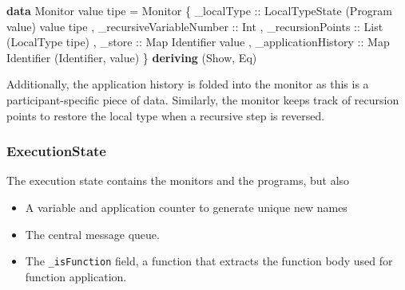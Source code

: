 \documentclass[runningheads]{llncs}
\providecommand{\tightlist}{%
  \setlength{\itemsep}{0pt}\setlength{\parskip}{0pt}}
\newenvironment{Shaded}{}{}
\newcommand{\KeywordTok}[1]{\textcolor[rgb]{0.00,0.44,0.13}{\textbf{#1}}}
\newcommand{\DataTypeTok}[1]{\textcolor[rgb]{0.56,0.13,0.00}{#1}}
\newcommand{\OtherTok}[1]{\textcolor[rgb]{0.00,0.44,0.13}{#1}}
\newcommand{\FunctionTok}[1]{\textcolor[rgb]{0.02,0.16,0.49}{#1}}
\newcommand{\NormalTok}[1]{#1}
\begin{document}
\begin{Shaded}
\begin{Highlighting}[]
\KeywordTok{data} \DataTypeTok{Monitor}\NormalTok{ value tipe }\FunctionTok{=} 
    \DataTypeTok{Monitor} 
\NormalTok{        \{}\OtherTok{ _localType ::} \DataTypeTok{LocalTypeState}\NormalTok{ (}\DataTypeTok{Program}\NormalTok{ value) value tipe}
\NormalTok{        ,}\OtherTok{ _recursiveVariableNumber ::} \DataTypeTok{Int}
\NormalTok{        ,}\OtherTok{ _recursionPoints ::} \DataTypeTok{List}\NormalTok{ (}\DataTypeTok{LocalType}\NormalTok{ tipe)}
\NormalTok{        ,}\OtherTok{ _store ::} \DataTypeTok{Map} \DataTypeTok{Identifier}\NormalTok{ value }
\NormalTok{        ,}\OtherTok{ _applicationHistory ::} \DataTypeTok{Map} \DataTypeTok{Identifier}\NormalTok{ (}\DataTypeTok{Identifier}\NormalTok{, value)}
\NormalTok{        \}}
        \KeywordTok{deriving}\NormalTok{ (}\DataTypeTok{Show}\NormalTok{, }\DataTypeTok{Eq}\NormalTok{)}
\end{Highlighting}
\end{Shaded}

Additionally, the application history is folded into the monitor as this
is a participant-specific piece of data. Similarly, the monitor keeps
track of recursion points to restore the local type when a recursive
step is reversed.

\subsubsection{ExecutionState}\label{executionstate}

The execution state contains the monitors and the programs, but also

\begin{itemize}
\tightlist
\item
  A variable and application counter to generate unique new names
\item
  The central message queue.
\item
  The \texttt{\_isFunction} field, a function that extracts the function
  body used for function application.
\end{itemize}
\end{document}
